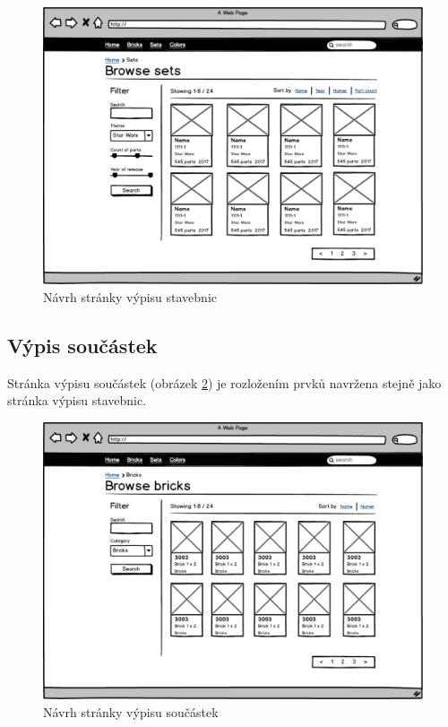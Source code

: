 \begin{figure}[htbp]
    \centering
    \includegraphics[width=\textwidth,height=\textheight,keepaspectratio]{pdfs/wireframe_sets.pdf}
    \caption{Návrh stránky výpisu stavebnic}\label{wireframe-stavebnice-seznam}
\end{figure}

\subsection{Výpis součástek}
Stránka výpisu součástek (obrázek \ref{wireframe-soucaska-seznam}) je rozložením prvků navržena stejně jako stránka výpisu stavebnic. 

\begin{figure}[htbp]
    \centering
    \includegraphics[width=\textwidth,height=\textheight,keepaspectratio]{pdfs/wireframe_bricks.pdf}
    \caption{Návrh stránky výpisu součástek}\label{wireframe-soucaska-seznam}
\end{figure}

